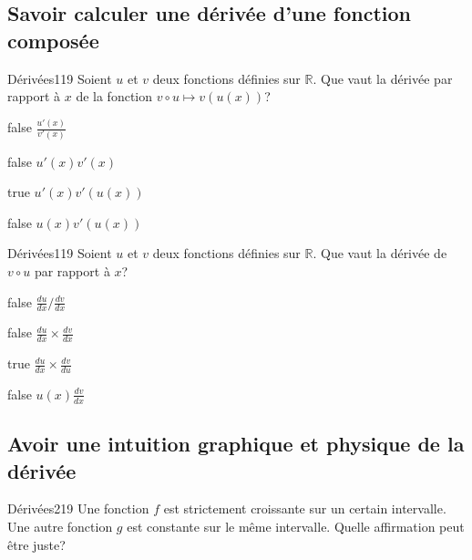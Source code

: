\documentclass[11pt]{article}
\begin{document}
        \subsection{Savoir calculer une dérivée d'une fonction composée}
        
        	\begin{question}{25}{Dérivées}{1}{19}
				Soient $u$ et $v$ deux fonctions définies sur $\mathbb{R}$. Que vaut la dérivée par rapport à $x$ de la fonction $v\circ u \mapsto v(u(x))$?
            \end{question}

            \begin{reponses}
            	\item[false] $\frac{u'(x)}{v'(x)}$
            	\item[false] $u'(x)v'(x)$
                \item[true] $u'(x)v'(u(x))$
                \item[false] $u(x)v'(u(x))$
            \end{reponses}
        
        	\begin{question}{25}{Dérivées}{1}{19}
				Soient $u$ et $v$ deux fonctions définies sur $\mathbb{R}$. Que vaut la dérivée de $v \circ u$ par rapport à $x$?
            \end{question}

            \begin{reponses}
            	\item[false] $\frac{du}{dx}/\frac{dv}{dx}$
            	\item[false] $\frac{du}{dx}\times \frac{dv}{dx}$
                \item[true] $\frac{du}{dx}\times \frac{dv}{du}$
                \item[false] $u(x)\frac{dv}{dx}$
            \end{reponses}
    
		\subsection{Avoir une intuition graphique et physique de la dérivée}

            \begin{question}{20}{Dérivées}{2}{19}
                Une fonction $f$ est strictement croissante sur un certain intervalle. Une autre fonction $g$ est constante sur le même intervalle. Quelle affirmation peut être juste?
            \end{question}
\end{document}

